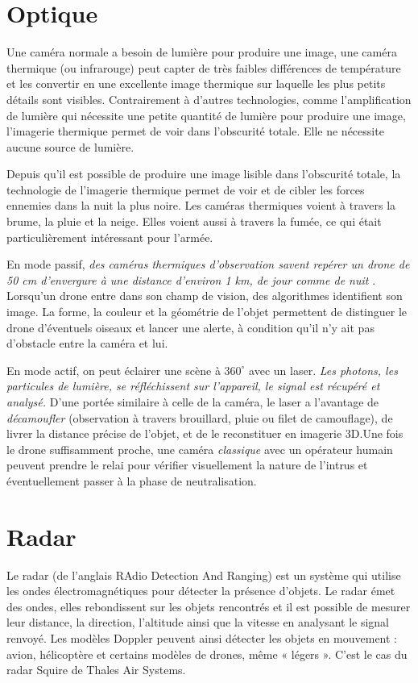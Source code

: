 \section{Optique}

Une caméra normale a besoin de lumière pour produire une image, une caméra thermique (ou infrarouge) peut capter de très faibles différences de température et les convertir en une excellente image thermique sur laquelle les plus petits détails sont visibles. Contrairement à d'autres technologies, comme l'amplification de lumière qui nécessite une petite quantité de lumière pour produire une image, l'imagerie thermique permet de voir dans l'obscurité totale. Elle ne nécessite aucune source de lumière.

Depuis qu'il est possible de produire une image lisible dans l'obscurité totale, la technologie de l'imagerie thermique permet de voir et de cibler les forces ennemies dans la nuit la plus noire. Les caméras thermiques voient à travers la brume, la pluie et la neige. Elles voient aussi à travers la fumée, ce qui était particulièrement intéressant pour l'armée.\cite{optique}

En mode passif, \emph{des caméras thermiques d'observation savent repérer un drone de 50 cm d'envergure à une distance d'environ 1 km, de jour comme de nuit} . Lorsqu'un drone entre dans son champ de vision, des algorithmes identifient son image. La forme, la couleur et la géométrie de l'objet permettent de distinguer le drone d'éventuels oiseaux et lancer une alerte, à condition qu'il n'y ait pas d'obstacle entre la caméra et lui.

En mode actif, on peut éclairer une scène à $360^{\circ}$ avec un laser. \emph{Les photons, les particules de lumière, se réfléchissent sur l'appareil, le signal est récupéré et analysé.} D'une portée similaire à celle de la caméra, le laser a l'avantage de \emph{décamoufler} (observation à travers brouillard, pluie ou filet de camouflage), de livrer la distance précise de l'objet, et de le reconstituer en imagerie 3D.Une fois le drone suffisamment proche, une caméra \textit{classique} avec un opérateur humain peuvent prendre le relai pour vérifier visuellement la nature de l'intrus et éventuellement passer à la phase de neutralisation.


\section{Radar}
Le radar (de l'anglais RAdio Detection And Ranging) est un système qui utilise les ondes électromagnétiques pour détecter la présence d'objets. Le radar émet des ondes, elles rebondissent sur les objets rencontrés et il est possible de mesurer leur distance, la direction, l'altitude ainsi que la vitesse en analysant le signal renvoyé. Les modèles Doppler peuvent ainsi détecter les objets en mouvement : avion, hélicoptère et certains modèles de drones, même « légers ». C'est le cas du radar Squire de Thales Air Systems. 

